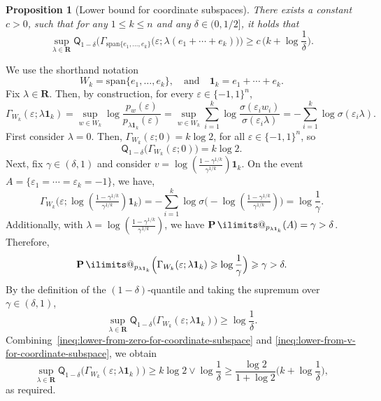 \documentclass[11pt, letterpaper, hidelinks]{article}
\makeatletter
\renewcommand{\proofname}{\textit{\textbf{Proof}}}
\renewenvironment{proof}[1][\proofname]{\par\pushQED{\qed}\normalfont \topsep6\p@\@plus6\p@\relax\trivlist\item[\hskip\labelsep#1\@addpunct{}]\ignorespaces}{\popQED\endtrivlist\@endpefalse}
\newcommand{\R}{\mathbf R}
\newcommand{\twomax}[2]{\ensuremath{#1 \lor #2}}
\newcommand{\1}{\mathbf 1}
\newcommand{\eps}{\varepsilon}
\renewcommand{\leq}{\leqslant}
\renewcommand{\geq}{\geqslant}
\newcommand{\spn}{\mathrm{span}}
\let\Span\spn
\renewcommand{\P}{\operatorname*{\mathbf{P}}\ilimits@}
\theoremstyle{plain}
\newtheorem{proposition}{Proposition}[section]
\theoremstyle{definition}
\newcommand{\defn}{=}
\newcommand{\Quant}[1]{\mathsf{Q}_{#1}}
\makeatother
\begin{document}
\begin{proposition}[Lower bound for coordinate subspaces]
\label{prop:coordinate-subspace-lower}
There exists a constant $c > 0$, such that for any $1 \leq k \leq n$ 
and any $\delta \in (0, 1/2]$, it holds that 
\[
\sup_{\lambda \in \R} 
\Quant{1-\delta}\Big(
	\Gamma_{\Span\{e_1, \dots, e_k\}}
	\big(\eps; \lambda (e_1 +\cdots +e_k)\big)
	\Big)
\geq 
c \, \Big(k + \log \frac{1}{\delta}\Big).
\]
\end{proposition}
\begin{proof}
	We use the shorthand notation
	\[
	W_k \defn \Span\{e_1,\dots,e_k\},
	\quad \mbox{and} \quad
	\1_k \defn e_1+\cdots+e_k.
	\]
	Fix $\lambda \in \R$. Then, by construction, 
	for every $\eps \in \{-1,1\}^n$, 
	\[
	\Gamma_{W_k}(\eps;\lambda \1_k)
	=
	\sup_{w \in W_k}\log \frac{p_w(\eps)}{p_{\lambda \1_k}(\eps)}
	=
	\sup_{w \in W_k}\sum_{i=1}^k
	\log \frac{\sigma(\eps_i w_i)}{\sigma(\eps_i \lambda)}
	=
	-\sum_{i=1}^k \log \sigma(\eps_i \lambda).
	\]
	First consider $\lambda = 0$. Then, $\Gamma_{W_k}(\eps;0) = 
	k \log 2$, for all $\eps \in \{-1,1\}^n$, so
	\begin{equation}
	\label{ineq:lower-from-zero-for-coordinate-subspace}
	\Quant{1-\delta}\big(\Gamma_{W_k}(\eps;0)\big)
	=k\log 2.
	\end{equation}
	Next, fix $\gamma\in(\delta,1)$ and consider
	$v = \log(\tfrac{1-\gamma^{1/k}}{\gamma^{1/k}})\1_k$. 
	On the event $A = \{\eps_1 = \cdots = \eps_k = -1\}$, 
	we have,
	\[
	\Gamma_{W_k}\Big(\eps; \log(\tfrac{1-\gamma^{1/k}}{\gamma^{1/k}})\1_k\Big)
	=
	-\sum_{i=1}^k \log \sigma\Big(-\log(\tfrac{1-\gamma^{1/k}}{\gamma^{1/k}})\Big)
	= \log \frac{1}{\gamma}.
	\]
	Additionally, with $\lambda = \log(\tfrac{1-\gamma^{1/k}}{\gamma^{1/k}})$, we have $\P_{p_{\lambda \1_k}}(A) = \gamma>\delta$. Therefore,
	\[
	\P_{p_{\lambda \1_k}}\Big(
	\Gamma_{W_k}(\eps; \lambda\1_k)
	\geq \log\frac{1}{\gamma}
	\Big)\geq\gamma>\delta.
	\]
	By the definition of the $(1-\delta)$-quantile and taking the supremum
	over $\gamma\in(\delta,1)$,
	\begin{equation}
	\label{ineq:lower-from-v-for-coordinate-subspace}
	\sup_{\lambda\in\R}\Quant{1-\delta}\Big(
	\Gamma_{W_k}(\eps; \lambda\1_k)
	\Big)
	\geq \log\frac{1}{\delta}.
	\end{equation}
	Combining~\cref{ineq:lower-from-zero-for-coordinate-subspace} and \cref{ineq:lower-from-v-for-coordinate-subspace}, we obtain
	\[
	\sup_{\lambda\in\R}
	\Quant{1-\delta}\Big(
	\Gamma_{W_k}(\eps;\lambda \1_k)
	\Big)
	\geq
	\twomax{k \log 2}{\log \frac{1}{\delta}} 
	\geq \frac{\log 2}{1 + \log 2}\Big( k + \log \frac{1}{\delta}\Big),
	\]
	as required.
\end{proof}    
\end{document}
